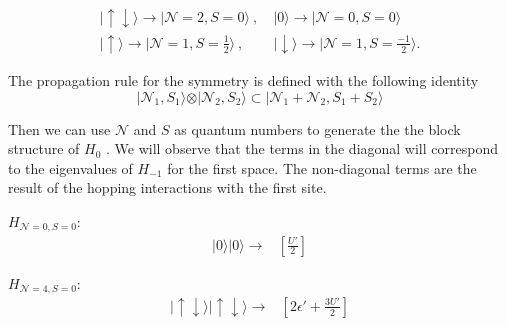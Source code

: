 \begin{align}
\vert \uparrow\downarrow\rangle\longrightarrow\vert \mathcal{N}=2,S=0\rangle\ ,& \ \vert0\rangle\longrightarrow\vert \mathcal{N}=0,S=0\rangle \\ 
\vert \uparrow\rangle\longrightarrow\vert \mathcal{N}=1,S=\frac{1}{2}\rangle\ ,& \ \vert \downarrow \rangle\longrightarrow\vert \mathcal{N}=1,S=\frac{-1}{2}\rangle.
\end{align}

The propagation rule for the symmetry is defined with the following identity 
\begin{equation}
  \vert \mathcal{N}_{1},S_{1}\rangle\otimes\vert \mathcal{N}_{2},S_{2}\rangle\subset\vert \mathcal{N}_{1}+\mathcal{N}_{2},S_{1}+S_{2}\rangle \label{eq:PropRuleQD}
\end{equation} 
  

 \noindent Then we can use  $\mathcal{N}$ and $S$ as quantum numbers to generate the the block structure of $H_{0}$ . We will observe that the terms in the diagonal will correspond to the eigenvalues of $H_{-1}$ for the first space. The non-diagonal terms are the result of the hopping interactions with the first site. 

\begin{multicols}{2}

$H_{\mathcal{N}=0,S=0}:$
\[
\begin{array}{c}
\vert0\rangle\vert0\rangle\rightarrow\end{array}\begin{array}{c}
\left[\frac{U'}{2}\right]\end{array}
\]


$H_{\mathcal{N}=4,S=0}:$
\[
\begin{array}{c}
\vert\uparrow\!\downarrow\rangle\vert\uparrow\!\downarrow\rangle\rightarrow\end{array}\begin{array}{c}
\left[2\epsilon'+\frac{3U'}{2}\right]\end{array}
\]


\end{multicols}

